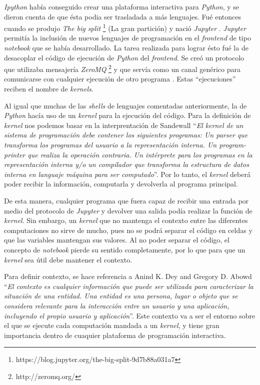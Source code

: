 \documentclass[11pt,spanish,listoffigures]{tfgetsinf}
\begin{document}
\textit{Ipython} había conseguido crear una plataforma interactiva para \textit{Python}, y se dieron cuenta de que ésta podia ser trasladada a más lenguajes. Fué entonces cuando se produjo\textit{ The big split} \footnote{https://blog.jupyter.org/the-big-split-9d7b88a031a7} (La gran partición) y nació \textit{Jupyter} \cite{jupyter-nb}. \textit{Jupyter} permitía la inclusión de nuevos lenguajes de programación en el \textit{frontend} de tipo \textit{notebook} que se había desarrollado. La tarea realizada para lograr ésto fué la de desacoplar el código de ejecución de \textit{Python} del \textit{frontend}. Se creó un protocolo que utilizaba mensajería \textit{ZeroMQ} \footnote{http://zeromq.org/} y que servía como un canal genérico para comunicarse con cualquier ejecución de otro programa \cite{wire-protocol}. Estas ``ejecuciones'' reciben el nombre de \textit{kernels}.

Al igual que muchas de las \textit{shells} de lenguajes comentadas anteriormente, la de \textit{Python} hacía uso de un \textit{kernel} para la ejecución del código. Para la definición de \textit{kernel} nos podemos basar en la interprentación de Sandewall ``\textit{El kernel de un sistema de programación debe contener los siguientes programas: Un parser que transforma los programas del usuario a la representación interna. Un program-printer que realiza la operación contraria. Un intérprete para los programas en la representación interna y/o un compilador que transforma la estructura de datos interna en languaje máquina para ser computado}''\cite{Sandewall}. Por lo tanto, el \textit{kernel} deberá poder recibir la información, computarla y devolverla al programa principal.

De esta manera, cualquier programa que fuera capaz de recibir una entrada por medio del protocolo de \textit{Jupyter} y devolver una salida podía realizar la función de \textit{kernel}. Sin embargo, un \textit{kernel} que no mantenga el contexto entre las diferentes computaciones no sirve de mucho, pues no se podrá separar el código en celdas y que las variables mantengan sus valores. Al no poder separar el código, el concepto de \textit{notebook} pierde su sentido completamente, por lo que para que un \textit{kernel} sea útil debe mantener el contexto.

Para definir contexto, se hace referencia a Anind K. Dey and Gregory D. Abowd \cite{context} ``\textit{El contexto es cualquier información que puede ser utilizada para caracterizar la situación de una entidad. Una entidad es una persona, lugar o objeto que se considera relevante para la interacción entre un usuario y una aplicación, incluyendo el propio usuario y aplicación}''. Este contexto va a ser el entorno sobre el que se ejecute cada computación mandada a un \textit{kernel}, y tiene gran importancia dentro de cuaquier plataforma de programación interactiva.
\end{document}
